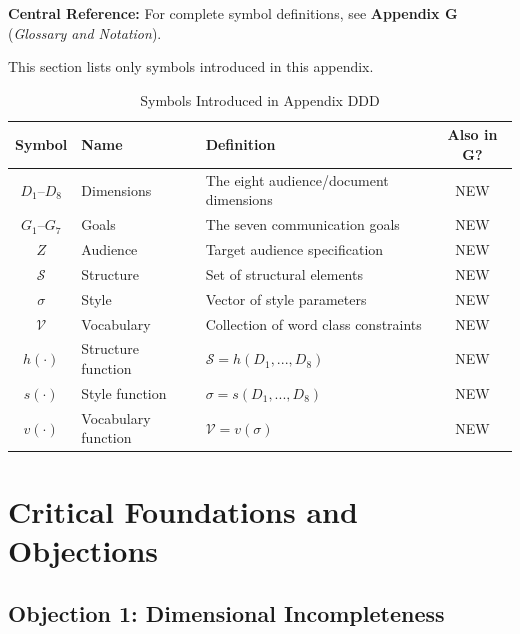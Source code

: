 \begin{tcolorbox}[colback=blue!5!white, colframe=blue!75!black]
\textbf{Central Reference:} For complete symbol definitions, see
\textbf{Appendix G} (\textit{Glossary and Notation}).

This section lists only symbols introduced in this appendix.
\end{tcolorbox}

\vspace{0.5em}

\begin{table}[htbp]
\centering
\caption{Symbols Introduced in Appendix DDD}
\label{tab:doctype-theory-symbols}
\renewcommand{\arraystretch}{1.3}
\begin{tabular}{@{}clp{6cm}c@{}}
\toprule
\textbf{Symbol} & \textbf{Name} & \textbf{Definition} & \textbf{Also in G?} \\
\midrule
$D_1$--$D_8$ & Dimensions & The eight audience/document dimensions & NEW \\
$G_1$--$G_7$ & Goals & The seven communication goals & NEW \\
$Z$ & Audience & Target audience specification & NEW \\
$\mathcal{S}$ & Structure & Set of structural elements & NEW \\
$\sigma$ & Style & Vector of style parameters & NEW \\
$\mathcal{V}$ & Vocabulary & Collection of word class constraints & NEW \\
$h(\cdot)$ & Structure function & $\mathcal{S} = h(D_1,...,D_8)$ & NEW \\
$s(\cdot)$ & Style function & $\sigma = s(D_1,...,D_8)$ & NEW \\
$v(\cdot)$ & Vocabulary function & $\mathcal{V} = v(\sigma)$ & NEW \\
\bottomrule
\end{tabular}
\end{table}


\section{Critical Foundations and Objections}
\label{sec:doctype-theory-critical}

\subsection{Objection 1: Dimensional Incompleteness}

